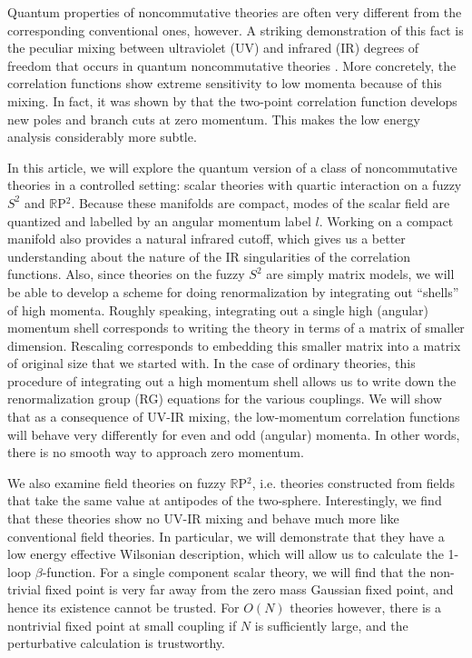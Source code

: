 \documentclass[a4paper,12pt]{article}
\numberwithin{equation}{section}
\begin{document}
Quantum properties of noncommutative theories are often very different
from the corresponding conventional ones, however. A striking
demonstration of this fact is the peculiar mixing between ultraviolet
(UV) and infrared (IR) degrees of freedom that occurs in quantum
noncommutative theories \cite{mrs}. More concretely, the correlation
functions show extreme sensitivity to low momenta because of this
mixing. In fact, it was shown by \cite{mrs} that the two-point
correlation function develops new poles and branch cuts at zero
momentum. This makes the low energy analysis considerably more subtle.

In this article, we will explore the quantum version of a class of
noncommutative theories in a controlled setting: scalar theories with
quartic interaction on a fuzzy $S^2$ and ${\mathbb R}$P$^2$. Because
these manifolds are compact, modes of the scalar field are quantized
and labelled by an angular momentum label $l$. Working on a compact
manifold also provides a natural infrared cutoff, which gives us a
better understanding about the nature of the IR singularities of the
correlation functions. Also, since theories on the fuzzy $S^2$ are
simply matrix models, we will be able to develop a scheme for doing
renormalization by integrating out ``shells'' of high momenta. Roughly
speaking, integrating out a single high (angular) momentum shell
corresponds to writing the theory in terms of a matrix of smaller
dimension. Rescaling corresponds to embedding this smaller matrix into
a matrix of original size that we started with. In the case of
ordinary theories, this procedure of integrating out a high momentum
shell allows us to write down the renormalization group (RG) equations
for the various couplings. We will show that as a consequence of UV-IR
mixing, the low-momentum correlation functions will behave very
differently for even and odd (angular) momenta. In other words, there
is no smooth way to approach zero momentum.

We also examine field theories on fuzzy ${\mathbb R}$P$^2$,
i.e. theories constructed from fields that take the same value at
antipodes of the two-sphere. Interestingly, we find that these
theories show no UV-IR mixing and behave much more like conventional
field theories. In particular, we will demonstrate that they have a
low energy effective Wilsonian description, which will allow us to
calculate the 1-loop $\beta$-function. For a single component scalar
theory, we will find that the non-trivial fixed point is very far away
from the zero mass Gaussian fixed point, and hence its existence
cannot be trusted. For $O(N)$ theories however, there is a nontrivial
fixed point at small coupling if $N$ is sufficiently large, and the
perturbative calculation is trustworthy.
\end{document}
